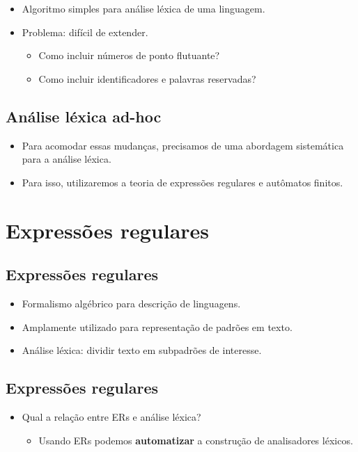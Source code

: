 \documentclass[11pt]{article}
\begin{document}
\begin{itemize}
\item Algoritmo simples para análise léxica de uma linguagem.

\item Problema: difícil de extender.
\begin{itemize}
\item Como incluir números de ponto flutuante?
\item Como incluir identificadores e palavras reservadas?
\end{itemize}
\end{itemize}
\subsection*{Análise léxica ad-hoc}
\label{sec:orgc80e057}

\begin{itemize}
\item Para acomodar essas mudanças, precisamos de uma abordagem
sistemática para a análise léxica.

\item Para isso, utilizaremos a teoria de expressões regulares
e autômatos finitos.
\end{itemize}
\section*{Expressões regulares}
\label{sec:org95193fa}

\subsection*{Expressões regulares}
\label{sec:orga0404e0}

\begin{itemize}
\item Formalismo algébrico para descrição de linguagens.
\item Amplamente utilizado para representação de padrões em texto.
\item Análise léxica: dividir texto em subpadrões de interesse.
\end{itemize}
\subsection*{Expressões regulares}
\label{sec:org79a8193}

\begin{itemize}
\item Qual a relação entre ERs e análise léxica?
\begin{itemize}
\item Usando ERs podemos \textbf{\textbf{automatizar}} a construção de analisadores léxicos.
\end{itemize}
\end{itemize}
\end{document}

